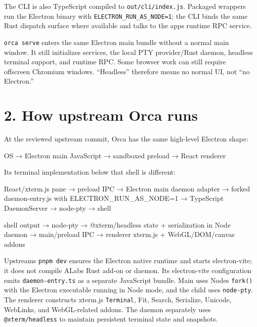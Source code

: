 \documentclass[
  10pt,
  letterpaper,
]{article}
\newenvironment{Shaded}{\begin{snugshade}}{\end{snugshade}}
\newcommand{\NormalTok}[1]{#1}
\begin{document}
The CLI is also TypeScript compiled to \texttt{out/cli/index.js}.
Packaged wrappers run the Electron binary with
\texttt{ELECTRON\_RUN\_AS\_NODE=1}; the CLI binds the same Rust dispatch
surface where available and talks to the app\textquotesingle s runtime
RPC service.

\texttt{orca\ serve} enters the same Electron main bundle without a
normal main window. It still initializes services, the local PTY
provider/Rust daemon, headless terminal support, and runtime RPC. Some
browser work can still require offscreen Chromium windows. ``Headless''
therefore means no normal UI, not ``no Electron.''

\section{2. How upstream Orca runs}\label{2-how-upstream-orca-runs}

At the reviewed upstream commit, Orca has the same high-level Electron
shape:

\begin{Shaded}
\begin{Highlighting}[]
\NormalTok{OS → Electron main JavaScript}
\NormalTok{   → sandboxed preload}
\NormalTok{   → React renderer}
\end{Highlighting}
\end{Shaded}

Its terminal implementation below that shell is different:

\begin{Shaded}
\begin{Highlighting}[]
\NormalTok{React/xterm.js pane}
\NormalTok{  → preload IPC}
\NormalTok{  → Electron main daemon adapter}
\NormalTok{  → forked daemon{-}entry.js with ELECTRON\_RUN\_AS\_NODE=1}
\NormalTok{  → TypeScript DaemonServer}
\NormalTok{  → node{-}pty}
\NormalTok{  → shell}

\NormalTok{shell output}
\NormalTok{  → node{-}pty}
\NormalTok{  → @xterm/headless state + serialization in Node daemon}
\NormalTok{  → main/preload IPC}
\NormalTok{  → renderer xterm.js + WebGL/DOM/canvas addons}
\end{Highlighting}
\end{Shaded}

Upstream\textquotesingle s \texttt{pnpm\ dev} ensures the Electron
native runtime and starts electron-vite; it does not compile
ALab\textquotesingle s Rust add-on or daemon. Its electron-vite
configuration emits \texttt{daemon-entry.ts} as a separate JavaScript
bundle. Main uses Node\textquotesingle s \texttt{fork()} with the
Electron executable running in Node mode, and the child uses
\texttt{node-pty}. The renderer constructs xterm.js \texttt{Terminal},
Fit, Search, Serialize, Unicode, WebLinks, and WebGL-related addons. The
daemon separately uses \texttt{@xterm/headless} to maintain persistent
terminal state and snapshots.
\end{document}
